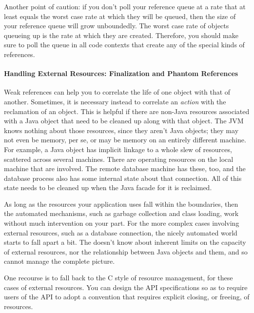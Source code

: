 Another point of caution: if you don't poll your reference queue at a rate that
at least equals the worst case rate at which they will be queued, then the size
of your reference queue will grow unboundedly. The worst case rate of objects
queueing up is the rate at which they are created. Therefore, you should make
sure to poll the queue in all code contexts that create any of the special kinds
of references.

\paragraph{Handling External Resources: Finalization and Phantom References}

Weak references can help you to correlate the life of one object with that of
another. Sometimes, it is necessary instead to correlate an \emph{action} with
the reclamation of an object. This is helpful if there are non-Java resources
associated with a Java object that need to be cleaned up along with that object.
The JVM knows nothing about those resources, since they aren't Java objects;
they may not even be memory, per se, or may be memory on an entirely different
machine. For example, a Java  object has implicit
linkage to a whole slew of resources, scattered across several machines. There
are operating resources on the local machine that are involved. The remote
database machine has these, too, and the database process also has some
internal state about that connection. All of this state needs to be cleaned up
when the Java facade for it is reclaimed.

As long as the resources your application uses fall within the \jress
boundaries, then the automated mechanisms, such as garbage collection and class
loading, work without much intervention on your part. For the more complex cases
involving external resources, such as a database connection, the nicely
automated world starts to fall apart a bit. The \jre doesn't know about inherent
limits on the capacity of external resources, nor the relationship between Java
objects and them, and so cannot manage the complete picture. 

One recourse is to fall back to the C style of resource management, for these
cases of external resources. You can design the API specifications so as to
require users of the API to adopt a convention that requires explicit closing,
or freeing, of resources.

